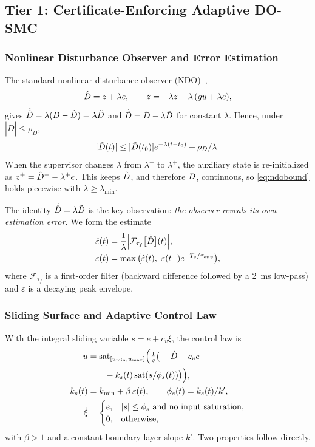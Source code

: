 \subsection{Tier 1: Certificate-Enforcing Adaptive DO-SMC}\label{sec:tier1}

\subsubsection{Nonlinear Disturbance Observer and Error Estimation}
The standard nonlinear disturbance observer (NDO)~\cite{chen2016dobc,li2014dobc},
\begin{equation}
\hat{D} = z + \lambda e,\qquad \dot z = -\lambda z - \lambda\,(g u + \lambda e),\label{eq:ndo}
\end{equation}
gives $\dot{\hat{D}} = \lambda(D-\hat{D}) = \lambda\tilde{D}$ and $\dot{\tilde{D}}=\dot D-\lambda\tilde{D}$ for constant $\lambda$. Hence, under $|\dot D|\le\rho_D$,
\begin{equation}
|\tilde{D}(t)|\le |\tilde{D}(t_0)|e^{-\lambda(t-t_0)}+\rho_D/\lambda.\label{eq:ndobound}
\end{equation}
When the supervisor changes $\lambda$ from $\lambda^-$ to $\lambda^+$, the auxiliary state is re-initialized as $z^+=\hat{D}^- - \lambda^+e$. This keeps $\hat{D}$, and therefore $\tilde{D}$, continuous, so \eqref{eq:ndobound} holds piecewise with $\lambda\ge\lambda_{\min}$.

The identity $\dot{\hat{D}}=\lambda\tilde{D}$ is the key observation: \emph{the observer reveals its own estimation error.} We form the estimate
\begin{align}
\hat\varepsilon(t)&=\frac{1}{\lambda}\Big|\mathcal{F}_{\tau_f}\big[\dot{\Dh}\big](t)\Big|,\nonumber\\
\varepsilon(t)&=\max\big(\hat\varepsilon(t),\ \varepsilon(t^-)e^{-T_s/\tau_{env}}\big),\label{eq:env}
\end{align}
where $\mathcal{F}_{\tau_f}$ is a first-order filter (backward difference followed by a \SI{2}{\milli\second} low-pass) and $\varepsilon$ is a decaying peak envelope.

\subsubsection{Sliding Surface and Adaptive Control Law}
With the integral sliding variable $s=e+c_v\xi$, the control law is
\begin{align}
u &= \mathrm{sat}_{[u_{\min},u_{\max}]}\Big(\tfrac{1}{g}\big(-\hat{D} - c_v e\nonumber\\
&\qquad - k_s(t)\,\mathrm{sat}(s/\phi_s(t))\big)\Big),\label{eq:law}\\
k_s(t) &= k_{\min}+\beta\,\varepsilon(t),\qquad \phi_s(t)=k_s(t)/k',\label{eq:ks}\\
\dot\xi &= \begin{cases} e, & |s|\le\phi_s \text{ and no input saturation},\\ 0, & \text{otherwise},\end{cases}\label{eq:condint}
\end{align}
with $\beta>1$ and a constant boundary-layer slope $k'$. Two properties follow directly.

